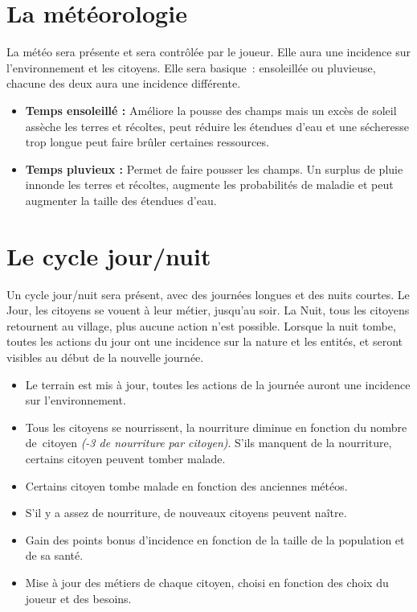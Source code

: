 \documentclass[a4paper]{article}
\begin{document}
\section*{La météorologie}
La météo sera présente et sera contrôlée par le joueur. Elle aura une incidence sur l'environnement et les citoyens. Elle sera basique : ensoleillée ou pluvieuse, chacune des deux aura une incidence différente. 
\begin{itemize}
\item \textbf{Temps ensoleillé :} \small{ Améliore la pousse des champs mais un excès de soleil assèche les terres et récoltes, peut réduire les étendues d'eau et une sécheresse trop longue peut faire brûler certaines ressources.}
\item \textbf{Temps pluvieux :} \small{ Permet de faire pousser les champs. Un surplus de pluie innonde les terres et récoltes, augmente les probabilités de maladie et peut augmenter la taille des étendues d'eau.}
\end{itemize}

\section*{Le cycle jour/nuit}
Un cycle jour/nuit sera présent, avec des journées longues et des nuits courtes. Le Jour, les citoyens se vouent à leur métier, jusqu'au soir. La Nuit, tous les citoyens retournent au village, plus aucune action n'est possible. Lorsque la nuit tombe, toutes les actions du jour ont une incidence sur la nature et les entités, et seront visibles au début de la nouvelle journée.
\begin{itemize} \small
\item Le terrain est mis à jour, toutes les actions de la journée auront une incidence sur l'environnement.
\item Tous les citoyens se nourrissent, la nourriture diminue en fonction du nombre de citoyen \textit{(-3 de nourriture par citoyen)}. S'ils manquent de la nourriture, certains citoyen peuvent tomber malade.
\item Certains citoyen tombe malade en fonction des anciennes météos.
\item S'il y a assez de nourriture, de nouveaux citoyens peuvent naître.
\item Gain des points bonus d'incidence en fonction de la taille de la population et de sa santé.
\item Mise à jour des métiers de chaque citoyen, choisi en fonction des choix du joueur et des besoins.
\end{itemize} \normalsize
\end{document}
